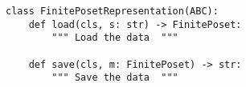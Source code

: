 \begin{verbatim}
class FinitePosetRepresentation(ABC):
    def load(cls, s: str) -> FinitePoset:
        """ Load the data  """

    def save(cls, m: FinitePoset) -> str:
        """ Save the data  """
\end{verbatim}